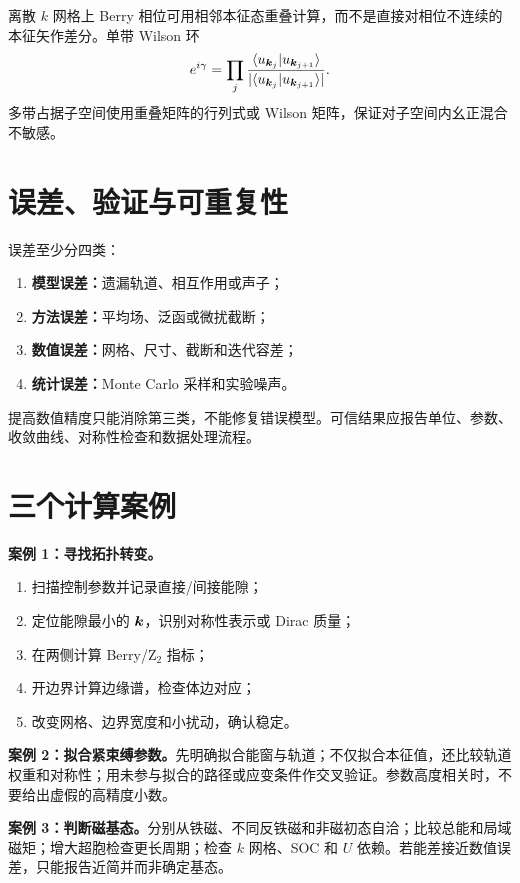 离散 $k$ 网格上 Berry 相位可用相邻本征态重叠计算，而不是直接对相位不连续的本征矢作差分。单带 Wilson 环
\[
e^{i\gamma}=\prod_j
\frac{\langle u_{\bm{k}_j}|u_{\bm{k}_{j+1}}\rangle}
{|\langle u_{\bm{k}_j}|u_{\bm{k}_{j+1}}\rangle|}.
\]
多带占据子空间使用重叠矩阵的行列式或 Wilson 矩阵，保证对子空间内幺正混合不敏感。

\section{误差、验证与可重复性}
误差至少分四类：
\begin{enumerate}
\item \textbf{模型误差：}遗漏轨道、相互作用或声子；
\item \textbf{方法误差：}平均场、泛函或微扰截断；
\item \textbf{数值误差：}网格、尺寸、截断和迭代容差；
\item \textbf{统计误差：}Monte Carlo 采样和实验噪声。
\end{enumerate}
提高数值精度只能消除第三类，不能修复错误模型。可信结果应报告单位、参数、收敛曲线、对称性检查和数据处理流程。

\section{三个计算案例}
\begin{examplebox}
\textbf{案例 1：寻找拓扑转变。}
\begin{enumerate}
\item 扫描控制参数并记录直接/间接能隙；
\item 定位能隙最小的 $\bm{k}$，识别对称性表示或 Dirac 质量；
\item 在两侧计算 Berry/Z$_2$ 指标；
\item 开边界计算边缘谱，检查体边对应；
\item 改变网格、边界宽度和小扰动，确认稳定。
\end{enumerate}
\end{examplebox}

\begin{examplebox}
\textbf{案例 2：拟合紧束缚参数。}先明确拟合能窗与轨道；不仅拟合本征值，还比较轨道权重和对称性；用未参与拟合的路径或应变条件作交叉验证。参数高度相关时，不要给出虚假的高精度小数。
\end{examplebox}

\begin{examplebox}
\textbf{案例 3：判断磁基态。}分别从铁磁、不同反铁磁和非磁初态自洽；比较总能和局域磁矩；增大超胞检查更长周期；检查 $k$ 网格、SOC 和 $U$ 依赖。若能差接近数值误差，只能报告近简并而非确定基态。
\end{examplebox}

